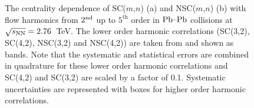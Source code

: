 \begin{figure}[h]
            \begin{center}
                       \hspace{-0.67cm}
        \caption{The centrality dependence of SC($m$,$n$) (a) and NSC($m$,$n$) (b) with flow harmonics from $2^{\rm nd}$ up to $5^{\mathrm{th}}$ order in $\textnormal{Pb--Pb}$ collisions at $\sqrt{s_{\textnormal{NN}}}=2.76$~TeV. The lower order harmonic correlations (SC(3,2), SC(4,2), NSC(3,2) and NSC(4,2)) are taken from \cite{ALICE:2016kpq} and shown as bands. Note that the systematic and statistical errors are combined in quadrature for these lower order harmonic correlations and SC(4,2) and SC(3,2) are scaled by a factor of 0.1. Systematic uncertainties are represented with boxes for higher order harmonic correlations.}
        \label{fig:Figure_1}
              \end{center}
\end{figure}


